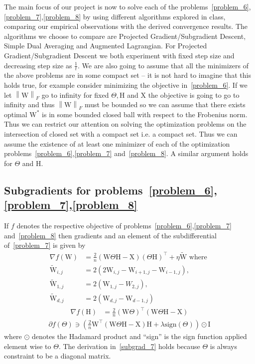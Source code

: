 \documentclass{article}
\newcommand{\0}{\mathrm{0}}
\newcommand{\1}{\mathrm{1}}
\renewcommand{\H}{\mathrm{H}}
\newcommand{\I}{\mathrm{I}}
\newcommand{\W}{\mathrm{W}}
\newcommand{\X}{\mathrm{X}}
\newcommand{\norm}[1]{\left\| #1 \right\|}
\begin{document}
The main focus of our project is now to solve each of the problems~\ref{problem_6},\ref{problem_7},\ref{problem_8} by using different algorithms explored in class, comparing our empirical observations with the derived convergence results. The algorithms we choose to compare are Projected Gradient/Subgradient Descent, Simple Dual Averaging and Augmented Lagrangian. For Projected Gradient/Subgradient Descent we both experiment with fixed step size and decreasing step size as $\frac{1}{t}$. We are also going to assume that all the minimizers of the above problems are in some compact set -- it is not hard to imagine that this holds true, for example consider minimizing the objective in~\ref{problem_6}. If we let $\norm{\W}_F$ go to infinity for fixed $\Theta,\H$ and $\X$ the objective is going to go to infinity and thus $\norm{\W}_F$ must be bounded so we can assume that there exists optimal $\W^*$ is in some bounded closed ball with respect to the Frobenius norm. Thus we can restrict our attention on solving the optimization problems on the intersection of closed set with a compact set i.e. a compact set. Thus we can assume the existence of at least one minimizer of each of the optimization problems~\ref{problem_6},\ref{problem_7} and~\ref{problem_8}.  A similar argument holds for $\Theta$ and $\H$.
\subsection{Subgradients for problems~\ref{problem_6},\ref{problem_7},\ref{problem_8}}
If $f$ denotes the respective objective of problems~\ref{problem_6},\ref{problem_7} and~\ref{problem_8} then gradients and an element of the subdifferential of~\ref{problem_7} is given by
\begin{equation}
  \label{subgrad_6}
  \begin{aligned}
    \nabla f(\W) &= \frac{2}{n} \left(\W\Theta\H - \X\right)\left(\Theta\H\right)^\top + \eta\tilde{\W} \text{ where }\\
    \tilde{\W}_{i,j} &= 2\left(2\W_{i,j} - \W_{i+1,j} - \W_{i-1,j}\right),\\
    \tilde{\W}_{1,j} &= 2\left(\W_{1,j} - W_{2,j}\right),\\
    \tilde{\W}_{d,j} &= 2\left(\W_{d,j} - \W_{d-1,j}\right)
    \end{aligned}
\end{equation}
\begin{equation}
  \label{subgrad_8}
  \begin{aligned}
    \nabla f(\H)  &= \frac{2}{n}\left(\W\Theta\right)^\top\left(\W\Theta\H - \X\right)
  \end{aligned}
\end{equation}
\begin{equation}
  \label{subgrad_7}
  \begin{aligned}
    \partial f(\Theta) \ni \left(\frac{2}{n}\W^\top\left(\W\Theta\H-\X\right)\H +\lambda\text{sign}\left(\Theta \right)\right)\odot\I
  \end{aligned}
\end{equation}
where $\odot$ denotes the Hadamard product and ``sign'' is the sign function applied element wise to $\Theta$. The derivation in~\ref{subgrad_7} holds because $\Theta$ is always constraint to be a diagonal matrix.
\end{document}
